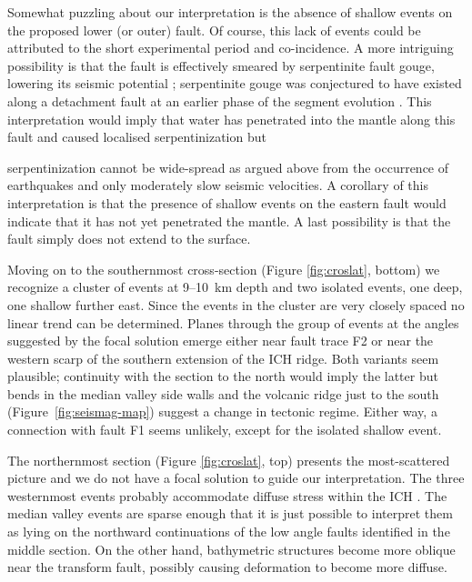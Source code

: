 \documentclass[jgr]{agu2001}
\newlength{\tw}
\begin{document}
\begin{article}
   Somewhat puzzling about our
interpretation is the absence of shallow events on the proposed lower
(or outer) fault.  Of course, this lack of events could be attributed
to the short experimental period and co-incidence.  A more intriguing
possibility is that the fault is effectively
smeared by serpentinite fault gouge, lowering its seismic potential \citep{reinen00};
serpentinite gouge was conjectured to have existed along a detachment
fault at an earlier phase of the segment evolution \citep{reston02}. This interpretation would imply that water
has penetrated into the mantle along this fault and caused localised
serpentinization but

serpentinization cannot be wide-spread as argued above from
the occurrence of earthquakes and only moderately slow seismic velocities.
 A corollary of this interpretation is that the presence of
shallow events on the eastern fault would indicate that it has not yet
penetrated the mantle.
A last possibility is that the fault simply does not extend to the
surface.

Moving on to the southernmost cross-section (Figure \ref{fig:croslat}, bottom)
we recognize a cluster of events at 9--10~km depth and two isolated
events, one deep, one shallow further east.  Since the events in the
cluster are very closely spaced no linear trend can be
determined. Planes through the group of events at the angles suggested
by the focal solution emerge either near fault trace F2 or near the
western scarp of the southern extension of the ICH ridge.  Both
variants seem plausible; continuity with the section to the north
would imply the latter but bends in the median valley side walls
 and the volcanic ridge just to the south (Figure~\ref{fig:seismag-map}) suggest
a change in tectonic regime.  Either way, a connection with fault F1
seems unlikely, except for the isolated shallow event.

The northernmost section (Figure \ref{fig:croslat}, top) presents the
most-scattered picture and we do not have a focal solution to guide
our interpretation.  The three westernmost events probably
accommodate diffuse stress within the ICH .  The median valley events
are sparse enough that it is just possible to interpret them as lying
on the northward continuations of the low angle faults identified in
the middle section.  On the other hand, bathymetric structures become
more oblique near the transform fault, possibly causing
deformation to become more diffuse. 


\end{article}
\end{document}
